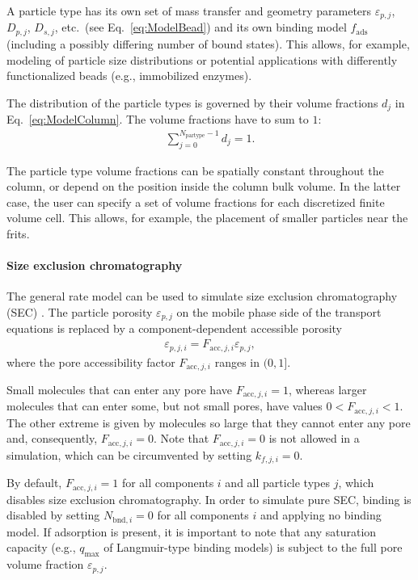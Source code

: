 A particle type  has its own set of mass transfer and geometry parameters $\varepsilon_{p,j}$, $D_{p,j}$, $D_{s,j}$, etc.\ (see Eq.~\eqref{eq:ModelBead}) and its own binding model $f_{\mathrm{ads}}$ (including a possibly differing number of bound states).
This allows, for example, modeling of particle size distributions or potential applications with differently functionalized beads (e.g., immobilized enzymes).

The distribution of the particle types is governed by their volume fractions $d_j$ in Eq.~\eqref{eq:ModelColumn}.
The volume fractions have to sum to $1$:
\begin{align*}
	\sum_{j=0}^{N_{\text{partype}} - 1} d_j = 1.
\end{align*}

The particle type volume fractions can be spatially constant throughout the column, or depend on the position inside the column bulk volume.
In the latter case, the user can specify a set of volume fractions for each discretized finite volume cell.
This allows, for example, the placement of smaller particles near the frits.

\paragraph{Size exclusion chromatography}
\label{par:MUOPGRMSizeExclusion}

The general rate model can be used to simulate size exclusion chromatography (SEC) \cite{Gu1995}. 
The particle porosity $\varepsilon_{p,j}$ on the mobile phase side of the transport equations is replaced by a component-dependent accessible porosity
\begin{align}
	\varepsilon_{p,j,i} = F_{\text{acc},j,i} \varepsilon_{p,j},
\end{align}
where the pore accessibility factor $F_{\text{acc},j,i}$ ranges in $(0, 1]$.

Small molecules that can enter any pore have $F_{\text{acc},j,i} = 1$, whereas larger molecules that can enter some, but not small pores, have values $0 < F_{\text{acc},j,i} < 1$.
The other extreme is given by molecules so large that they cannot enter any pore and, consequently, $F_{\text{acc},j,i} = 0$.
Note that $F_{\text{acc},j,i} = 0$ is not allowed in a simulation, which can be circumvented by setting $k_{f,j,i} = 0$.

By default, $F_{\text{acc},j,i} = 1$ for all components $i$ and all particle types $j$, which disables size exclusion chromatography.
In order to simulate pure SEC, binding is disabled by setting $N_{\text{bnd},i} = 0$ for all components $i$ and applying no binding model.
If adsorption is present, it is important to note that any saturation capacity (e.g., $q_{\text{max}}$ of Langmuir-type binding models) is subject to the full pore volume fraction $\varepsilon_{p,j}$.

